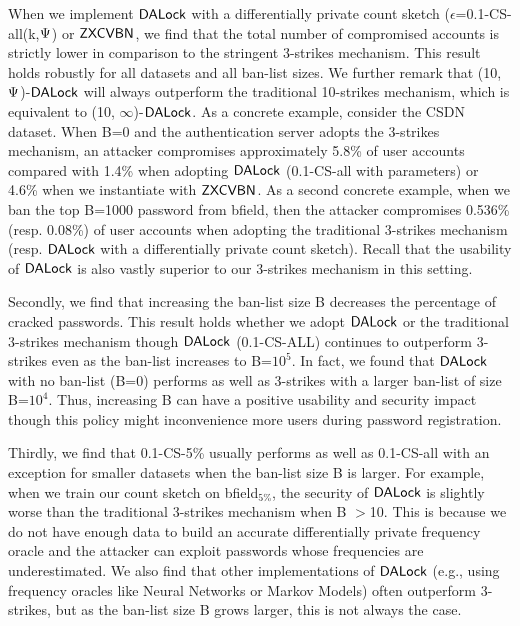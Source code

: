  When we implement $\mathsf{DALock}$ with a differentially private count sketch ($\epsilon$=0.1-CS-all(k,$\Psi$) or $\mathsf{ZXCVBN}$, we find that the total number of compromised accounts is strictly lower in comparison to the stringent 3-strikes mechanism. This result holds robustly for all datasets and all ban-list sizes. We further remark that (10,$\Psi$)-$\mathsf{DALock}$ will always outperform the traditional 10-strikes mechanism, which is equivalent to (10, $\infty$)-$\mathsf{DALock}$. As a concrete example, consider the CSDN dataset. When B=0 and the authentication server adopts the 3-strikes mechanism, an attacker compromises approximately 5.8\% of user accounts compared with 1.4\% when adopting $\mathsf{DALock}$ (0.1-CS-all with parameters) or 4.6\% when we instantiate with $\mathsf{ZXCVBN}$. As a second concrete example, when we ban the top B=1000 password from bfield, then the attacker compromises 0.536\% (resp. 0.08\%) of user accounts when adopting the traditional 3-strikes mechanism (resp. $\mathsf{DALock}$ with a differentially private count sketch). Recall that the usability of $\mathsf{DALock}$ is also vastly superior to our 3-strikes mechanism in this setting.

Secondly, we find that increasing the ban-list size B decreases the percentage of cracked passwords. This result holds whether we adopt $\mathsf{DALock}$ or the traditional 3-strikes mechanism though $\mathsf{DALock}$ (0.1-CS-ALL) continues to outperform 3-strikes even as the ban-list increases to B=$10^5$. In fact, we found that $\mathsf{DALock}$ with no ban-list (B=0) performs as well as 3-strikes with a larger ban-list of size B=$10^4$.  Thus, increasing B can have a positive usability and security impact though this policy might inconvenience more users during password registration.  

Thirdly,  we find that 0.1-CS-5\% usually performs as well as 0.1-CS-all with an exception for smaller datasets when the ban-list size B is larger. For example, when we train our count sketch on bfield$_{5\%}$, the security of $\mathsf{DALock}$ is slightly worse than the traditional 3-strikes mechanism when B $>$10. This is because we do not have enough data to build an accurate differentially private frequency oracle and the attacker can exploit passwords whose frequencies are underestimated. We also find that other implementations of $\mathsf{DALock}$ (e.g., using frequency oracles like Neural Networks or Markov Models) often outperform 3-strikes, but as the ban-list size B grows larger, this is not always the case.



